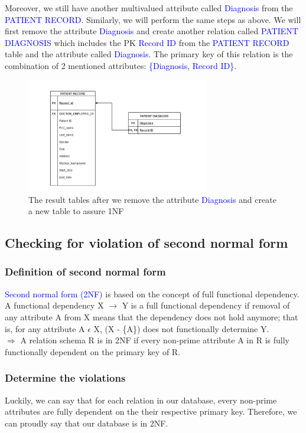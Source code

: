 \documentclass[a4paper]{article}
\numberwithin{equation}{section}
\begin{document}
Moreover, we still have another multivalued attribute called \textcolor{blue}{Diagnosis} from the \textcolor{blue}{PATIENT RECORD}\@.
Similarly, we will perform the same steps as above. We will first remove the attribute \textcolor{blue}{Diagnosis} and create another relation called \textcolor{blue}{PATIENT DIAGNOSIS} which includes the PK \textcolor{blue}{Record ID} from the \textcolor{blue}{PATIENT RECORD} table and the attribute called \textcolor{blue}{Diagnosis}. The primary key of this relation is the combination of 2 mentioned attributes: \textcolor{blue}{\{Diagnosis, Record ID\}}.
\begin{figure}[H]
  \centering
  \includegraphics[width = 8cm ]{assets/1NFsolution2.PNG}
  \captionsetup{justification=centering,margin=2cm}
  \caption{The result tables after we remove the attribute \textcolor{blue}{Diagnosis} and create a new table to assure 1NF}
\end{figure}


\subsection{Checking for violation of second normal form}
\subsubsection{Definition of second normal form }
\textcolor{blue}{Second normal form (2NF)} is based on the concept of full functional dependency.
A functional dependency X \(\rightarrow \) Y is a full functional dependency if removal of any attribute A from X means that the dependency does not hold anymore; that is, for any attribute A \(\epsilon \) X, (X - \{A\}) does not functionally determine Y. \\
\(\Rightarrow \) A relation schema R is in 2NF if every non-prime attribute A in R is
fully functionally dependent on the primary key of R.

\subsubsection{Determine the violations}
Luckily, we can say that for each relation in our database, every non-prime attributes are fully dependent on the their respective primary key. Therefore, we can proudly say that our database is in 2NF\@.
\end{document}
